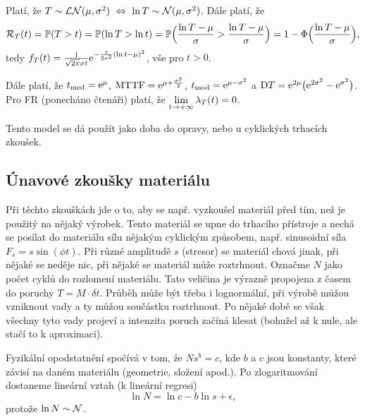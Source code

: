 \begin{define}
	Platí, že $T\sim \mathcal{LN}(\mu,\sigma^2)~\Leftrightarrow~\ln T\sim\mathcal{N}(\mu,\sigma^2)$. Dále platí, že $$\mathcal{R}_T(t)=\mathbb{P}(T>t)=\mathbb{P}(\ln T>\ln t)=\mathbb{P}\Big(\frac{\ln T-\mu}{\sigma}>\frac{\ln T-\mu}{\sigma}\Big)=1-\Phi\Big(\frac{\ln T-\mu}{\sigma}\Big),$$ tedy $f_T(t)=\frac{1}{\sqrt{2\pi}\sigma t}\mathrm{e}^{-\frac{1}{2\sigma^2}(\ln t-\mu)^2}$, vše pro $t>0$.
\end{define}

Dále platí, že $t_\mathrm{med}=\mathrm{e}^{\mu}$, $\mathrm{MTTF}=\mathrm{e}^{\mu+\frac{\sigma^2}{2}}$, $t_\mathrm{mod}=\mathrm{e}^{\mu-\sigma^2}$ a $\mathrm{D} T=\mathrm{e}^{2\mu}\big(\mathrm{e}^{2\sigma^2}-\mathrm{e}^{\sigma^2}\big)$. Pro FR (ponecháno čtenáři) platí, že $\lim\limits_{t\to+\infty}\lambda_T(t)=0$.

Tento model se dá použít jako doba do opravy, nebo u cyklických trhacích zkoušek.

\subsection{Únavové zkoušky materiálu}
Při těchto zkouškách jde o to, aby se např. vyzkoušel materiál před tím, než je použitý na nějaký výrobek. Tento materiál se upne do trhacího přístroje a nechá se posílat do materiálu sílu nějakým cyklickým způsobem, např. sinusoidní síla $F_s=s\sin(\phi t)$. Při různé amplitudě $s$ (stresor) se materiál chová jinak, při nějaké se neděje nic, při nějaké se materiál může roztrhnout. Označme $N$ jako počet cyklů do rozlomení materiálu. Tato veličina je výrazně propojena z časem do poruchy $T=M\cdot\delta t$. Průběh může být třeba i lognormální, při výrobě můžou vzniknout vady a ty můžou součástku roztrhnout. Po nějaké době se však všechny tyto vady projeví a intenzita poruch začíná klesat (bohužel až k nule, ale stačí to k aproximaci).

Fyzikální opodstatnění spočívá v tom, že $Ns^b=c$, kde $b$ a $c$ jsou konstanty, které závisí na daném materiálu (geometrie, složení apod.). Po zlogaritmování dostaneme lineární vztah (k lineární regresi)
$$ \ln N=\ln c-b\ln s + \epsilon, $$
protože $\ln N\sim \mathcal{N}$.


